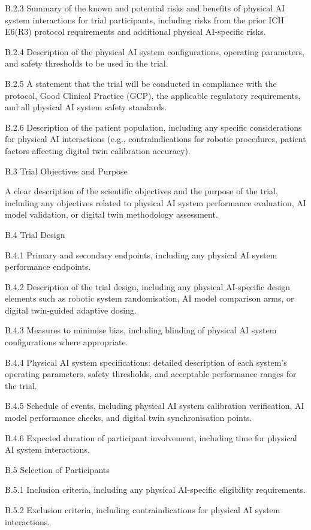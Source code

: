 B.2.3 Summary of the known and potential risks and benefits of physical AI system interactions for trial participants, including risks from the prior ICH E6(R3) protocol requirements and additional physical AI-specific risks.

B.2.4 Description of the physical AI system configurations, operating parameters, and safety thresholds to be used in the trial.

B.2.5 A statement that the trial will be conducted in compliance with the protocol, Good Clinical Practice (GCP), the applicable regulatory requirements, and all physical AI system safety standards.

B.2.6 Description of the patient population, including any specific considerations for physical AI interactions (e.g., contraindications for robotic procedures, patient factors affecting digital twin calibration accuracy).

B.3 Trial Objectives and Purpose

A clear description of the scientific objectives and the purpose of the trial, including any objectives related to physical AI system performance evaluation, AI model validation, or digital twin methodology assessment.

B.4 Trial Design

B.4.1 Primary and secondary endpoints, including any physical AI system performance endpoints.

B.4.2 Description of the trial design, including any physical AI-specific design elements such as robotic system randomisation, AI model comparison arms, or digital twin-guided adaptive dosing.

B.4.3 Measures to minimise bias, including blinding of physical AI system configurations where appropriate.

B.4.4 Physical AI system specifications: detailed description of each system's operating parameters, safety thresholds, and acceptable performance ranges for the trial.

B.4.5 Schedule of events, including physical AI system calibration verification, AI model performance checks, and digital twin synchronisation points.

B.4.6 Expected duration of participant involvement, including time for physical AI system interactions.

B.5 Selection of Participants

B.5.1 Inclusion criteria, including any physical AI-specific eligibility requirements.

B.5.2 Exclusion criteria, including contraindications for physical AI system interactions.

